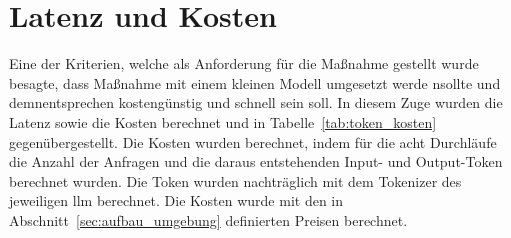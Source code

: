 \section{Latenz und Kosten}\label{sec:latenz_kosten}

Eine der Kriterien, welche als Anforderung für die Maßnahme gestellt wurde besagte, dass Maßnahme mit einem kleinen Modell umgesetzt werde nsollte und demnentsprechen
kostengünstig und schnell sein soll. In diesem Zuge wurden die Latenz sowie die Kosten berechnet und in Tabelle~\ref{tab:token_kosten} gegenübergestellt. Die Kosten 
wurden berechnet, indem für die acht Durchläufe die Anzahl der Anfragen und die daraus entstehenden Input- und Output-Token berechnet wurden. Die Token wurden 
nachträglich mit dem Tokenizer des jeweiligen \ac{llm} berechnet. Die Kosten wurde mit den in Abschnitt~\ref{sec:aufbau_umgebung} definierten Preisen berechnet.

\begin{table}[htbp]
\centering
\caption{Anfragen, Token, Kosten und Latenz der Durchläufe}
\label{tab:token_kosten}

\end{table}

